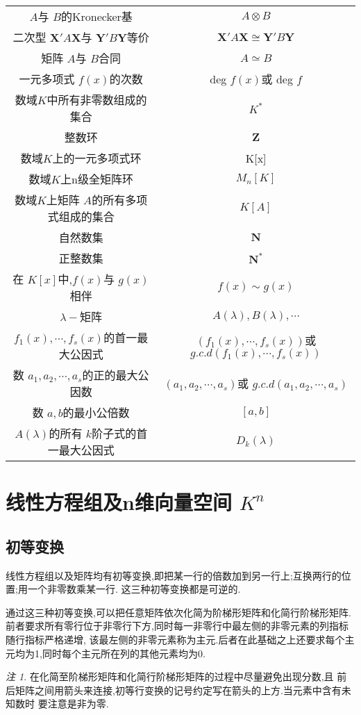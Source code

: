 \documentclass[a4paper,11pt]{article}%
\theoremstyle{remark}
\newtheorem*{remark}{注}
\theoremstyle{definition}
\theoremstyle{definition}
\theoremstyle{plain}
\begin{document}
\begin{longtable}{cc}
        $A$与 $B$的Kronecker基& $A \otimes B$\\
        二次型 $\mathbf{X}'A\mathbf{X}$与 $\mathbf{Y}'B\mathbf{Y}$等价 & $\mathbf{X}'A\mathbf{X} \cong \mathbf{Y}'B\mathbf{Y}$\\
        矩阵 $A$与 $B$合同& $A\simeq B$\\
        一元多项式 $f(x)$的次数& deg $f(x)$或 deg $f$\\
        数域$K$中所有非零数组成的集合 & $K^*$\\
        整数环&$\mathbf{Z}$\\
        数域$K$上的一元多项式环&K[x]\\
        数域$K$上n级全矩阵环& $M_n[K]$\\
        数域$K$上矩阵 $A$的所有多项式组成的集合& $K[A]$\\
        自然数集& $\mathbf{N}$\\
        正整数集 & $\mathbf{N}^*$\\
        在 $K[x]$中,$f(x)$与 $g(x)$相伴& $f(x)\sim g(x)$\\
        $\lambda-$矩阵&$A(\lambda),B(\lambda),\cdots$\\
        $f_1(x ),\cdots,f_s(x)$的首一最大公因式& $(f_1(x),\cdots,f_s(x))$或 $g.c.d(f_1(x),\cdots,f_s(x))$\\
        数 $a_1,a_2,\cdots,a_s$的正的最大公因数& $(a_1,a_2,\cdots,a_s)$或 $g.c.d(a_1,a_2,\cdots,a_s)$\\
        数 $a,b$的最小公倍数& $[a,b]$\\
        $A(\lambda)$的所有 $k$阶子式的首一最大公因式&$D_k(\lambda)$\\
\end{longtable}
\newpage
\section{线性方程组及n维向量空间 $K^n$}
\subsection{初等变换}
线性方程组以及矩阵均有初等变换,即把某一行的倍数加到另一行上;互换两行的位置;用一个非零数乘某一行.
这三种初等变换都是可逆的.

通过这三种初等变换,可以把任意矩阵依次化简为阶梯形矩阵和化简行阶梯形矩阵.
前者要求所有零行位于非零行下方,同时每一非零行中最左侧的非零元素的列指标随行指标严格递增,
该最左侧的非零元素称为主元.后者在此基础之上还要求每个主元均为1,同时每个主元所在列的其他元素均为0.
\begin{remark}
    在化简至阶梯形矩阵和化简行阶梯形矩阵的过程中尽量避免出现分数,且
    前后矩阵之间用箭头来连接,初等行变换的记号约定写在箭头的上方.当元素中含有未知数时
    要注意是非为零.
\end{remark}
\end{document}

